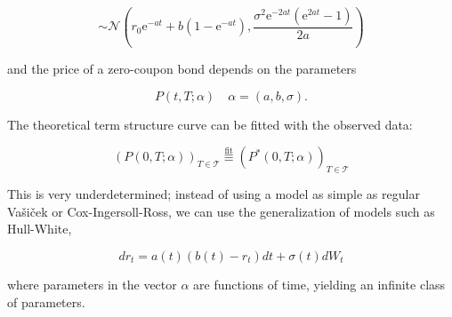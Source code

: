 \documentclass[oneside,titlepage,headinclude,12pt,a4paper,BCOR5mm,footinclude]{book}
\theoremstyle{defn}
\newcommand{\eexp}{\mathrm{e}}
\newcommand\NN{\mathcal{N}}
\begin{document}
\[
  \sim \NN\left(
    r_0 \eexp^{-at}+b(1-\eexp^{-at}), \frac{\sigma^2\eexp^{-2at}(\eexp^{2at}-1)}{2a}
  \right)
\]

and the price of a zero-coupon bond depends on the parameters

\[
  P(t,T;\alpha) \quad \alpha = (a,b,\sigma).
\]

The theoretical term structure curve can be fitted with the observed data:

\[
  \left( P(0,T;\alpha)\right)_{T\in \mathcal{T}} \stackrel{\text{fit}}{\equiv}
  \left( P^*(0,T;\alpha)\right)_{T\in \mathcal{T}} 
\]

This is  very underdetermined;  instead of  using a model  as simple  as regular
Va\v{s}i\v{c}ek or Cox-Ingersoll-Ross,  we can use the  generalization of models
such as Hull-White,

\[
  dr_t = a(t)(b(t) - r_t)dt +\sigma(t)dW_t
\]

where  parameters in  the vector  $\alpha$ are  functions of  time, yielding  an
infinite class of parameters.
\end{document}
